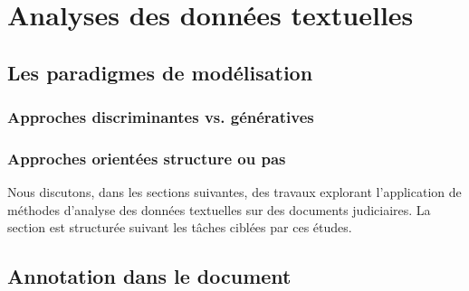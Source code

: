 




\section{Analyses des données textuelles}
\label{sec:literature:legaltal}

\subsection{Les paradigmes de modélisation}

\subsubsection{Approches discriminantes vs. génératives}

\subsubsection{Approches orientées structure ou pas}


Nous discutons, dans les sections suivantes, des travaux explorant l'application de méthodes d'analyse des données textuelles sur des documents judiciaires. La section est structurée suivant les tâches ciblées par ces études.

\subsection{Annotation dans le document}


